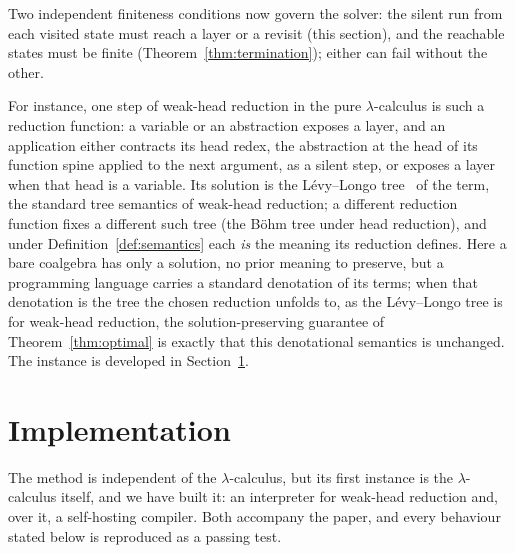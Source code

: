 Two independent finiteness conditions now govern the solver: the silent run from each visited
state must reach a layer or a revisit (this section), and the reachable states must be finite
(Theorem~\ref{thm:termination}); either can fail without the other.

For instance, one step of weak-head reduction in the pure $\lambda$-calculus is such a
reduction function: a variable or an abstraction exposes a layer, and an application either
contracts its head redex, the abstraction at the head of its function spine applied to the next
argument, as a silent step, or exposes a layer when that head is a variable. Its solution is the L\'evy--Longo tree~\cite{longo1983-set-theoretical-models} of the
term, the standard tree semantics of weak-head reduction; a different reduction function fixes a
different such tree (the B\"ohm tree under head reduction), and under
Definition~\ref{def:semantics} each \emph{is} the meaning its reduction defines. Here a bare
coalgebra has only a solution, no prior meaning to preserve, but a programming language carries a
standard denotation of its terms; when that denotation is the tree the chosen reduction unfolds
to, as the L\'evy--Longo tree is for weak-head reduction, the solution-preserving guarantee of
Theorem~\ref{thm:optimal} is exactly that this denotational semantics is unchanged. The instance
is developed in Section~\ref{sec:bridge}.

\section{Implementation}\label{sec:bridge}
The method is independent of the $\lambda$-calculus, but its first instance is the
$\lambda$-calculus itself, and we have built it: an interpreter for weak-head reduction and, over
it, a self-hosting compiler. Both accompany the paper, and every behaviour stated below is reproduced as a passing test.

